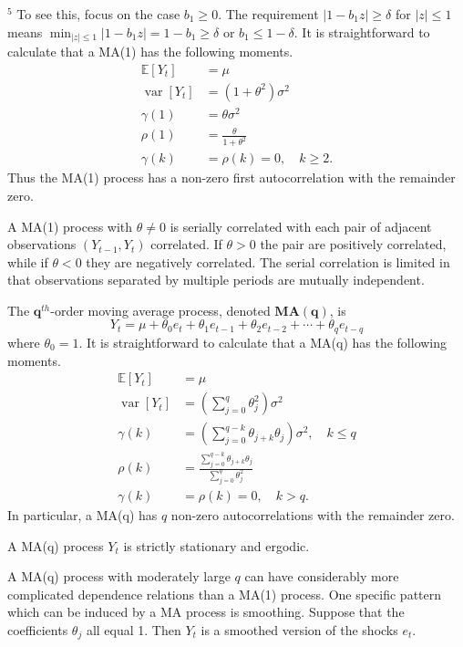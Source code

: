 \documentclass[10pt]{article}
\begin{document}
${ }^{5}$ To see this, focus on the case $b_{1} \geq 0$. The requirement $\left|1-b_{1} z\right| \geq \delta$ for $|z| \leq 1$ means $\min _{|z| \leq 1}\left|1-b_{1} z\right|=1-b_{1} \geq \delta$ or $b_{1} \leq 1-\delta$. It is straightforward to calculate that a MA(1) has the following moments.
$$
\begin{aligned}
\mathbb{E}\left[Y_{t}\right] &=\mu \\
\operatorname{var}\left[Y_{t}\right] &=\left(1+\theta^{2}\right) \sigma^{2} \\
\gamma(1) &=\theta \sigma^{2} \\
\rho(1) &=\frac{\theta}{1+\theta^{2}} \\
\gamma(k) &=\rho(k)=0, \quad k \geq 2 .
\end{aligned}
$$
Thus the MA(1) process has a non-zero first autocorrelation with the remainder zero.

A MA(1) process with $\theta \neq 0$ is serially correlated with each pair of adjacent observations $\left(Y_{t-1}, Y_{t}\right)$ correlated. If $\theta>0$ the pair are positively correlated, while if $\theta<0$ they are negatively correlated. The serial correlation is limited in that observations separated by multiple periods are mutually independent.

The $\mathbf{q}^{t h}$-order moving average process, denoted $\mathbf{M A}(\mathbf{q})$, is
$$
Y_{t}=\mu+\theta_{0} e_{t}+\theta_{1} e_{t-1}+\theta_{2} e_{t-2}+\cdots+\theta_{q} e_{t-q}
$$
where $\theta_{0}=1$. It is straightforward to calculate that a MA(q) has the following moments.
$$
\begin{aligned}
\mathbb{E}\left[Y_{t}\right] &=\mu \\
\operatorname{var}\left[Y_{t}\right] &=\left(\sum_{j=0}^{q} \theta_{j}^{2}\right) \sigma^{2} \\
\gamma(k) &=\left(\sum_{j=0}^{q-k} \theta_{j+k} \theta_{j}\right) \sigma^{2}, \quad k \leq q \\
\rho(k) &=\frac{\sum_{j=0}^{q-k} \theta_{j+k} \theta_{j}}{\sum_{j=0}^{q} \theta_{j}^{2}} \\
\gamma(k) &=\rho(k)=0, \quad k>q .
\end{aligned}
$$
In particular, a MA(q) has $q$ non-zero autocorrelations with the remainder zero.

A MA(q) process $Y_{t}$ is strictly stationary and ergodic.

A MA(q) process with moderately large $q$ can have considerably more complicated dependence relations than a MA(1) process. One specific pattern which can be induced by a MA process is smoothing. Suppose that the coefficients $\theta_{j}$ all equal 1. Then $Y_{t}$ is a smoothed version of the shocks $e_{t}$.
\end{document}

